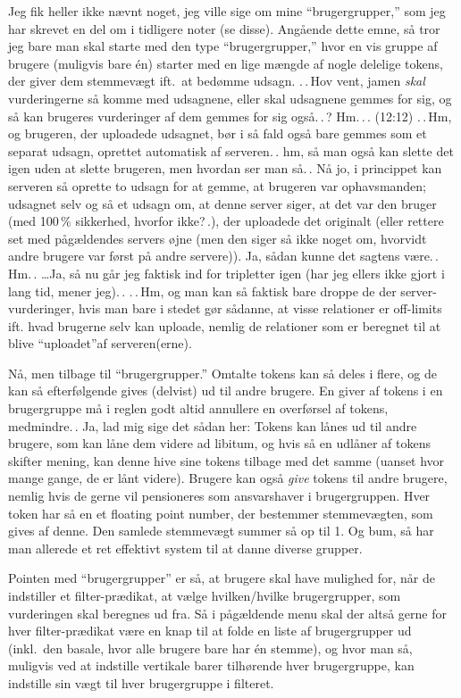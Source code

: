 \documentclass{report}
\begin{document}
Jeg fik heller ikke nævnt noget, jeg ville sige om mine ``brugergrupper,'' som jeg har skrevet en del om i tidligere noter (se disse). Angående dette emne, så tror jeg bare man skal starte med den type ``brugergrupper,'' hvor en vis gruppe af brugere (muligvis bare én) starter med en lige mængde af nogle delelige tokens, der giver dem stemmevægt ift.\ at bedømme udsagn. .\,.\,Hov vent, jamen \emph{skal} vurderingerne så komme med udsagnene, eller skal udsagnene gemmes for sig, og så kan brugeres vurderinger af dem gemmes for sig også.\,.\,? Hm.\,.\,. (12:12) .\,.\,Hm, og brugeren, der uploadede udsagnet, bør i så fald også bare gemmes som et separat udsagn, oprettet automatisk af serveren.\,. hm, så man også kan slette det igen uden at slette brugeren, men hvordan ser man så.\,. Nå jo, i princippet kan serveren så oprette to udsagn for at gemme, at brugeren var ophavsmanden; udsagnet selv og så et udsagn om, at denne server siger, at det var den bruger (med 100\,\% sikkerhed, hvorfor ikke?\,.), der uploadede det originalt (eller rettere set med pågældendes servers øjne (men den siger så ikke noget om, hvorvidt andre brugere var først på andre servere)). Ja, sådan kunne det sagtens være.\,. Hm.\,. \ldots Ja, så nu går jeg faktisk ind for tripletter igen (har jeg ellers ikke gjort i lang tid, mener jeg).\,. .\,.\,Hm, og man kan så faktisk bare droppe de der server-vurderinger,
hvis man bare i stedet gør sådanne, at visse relationer er off-limits ift. hvad brugerne selv kan uploade, nemlig de relationer som er beregnet til at blive ``uploadet''af serveren(erne). 

Nå, men tilbage til ``brugergrupper.'' Omtalte tokens kan så deles i flere, og de kan så efterfølgende gives (delvist) ud til andre brugere. En giver af tokens i en brugergruppe må i reglen godt altid annullere en overførsel af tokens, medmindre.\,. Ja, lad mig sige det sådan her: Tokens kan lånes ud til andre brugere, som kan låne dem videre ad libitum, og hvis så en udlåner af tokens skifter mening, kan denne hive sine tokens tilbage med det samme (uanset hvor mange gange, de er lånt videre). Brugere kan også \emph{give} tokens til andre brugere, nemlig hvis de gerne vil pensioneres som ansvarshaver i brugergruppen. Hver token har så en et floating point number, der bestemmer stemmevægten, som gives af denne. Den samlede stemmevægt summer så op til 1. Og bum, så har man allerede et ret effektivt system til at danne diverse grupper.

Pointen med ``brugergrupper'' er så, at brugere skal have mulighed for, når de indstiller et filter-prædikat, at vælge hvilken/hvilke brugergrupper, som vurderingen skal beregnes ud fra. Så i pågældende menu skal der altså gerne for hver filter-prædikat være en knap til at folde en liste af brugergrupper ud (inkl.\ den basale, hvor alle brugere bare har én stemme), og hvor man så, muligvis ved at indstille vertikale barer tilhørende hver brugergruppe, kan indstille sin vægt til hver brugergruppe i filteret. 
\end{document}

